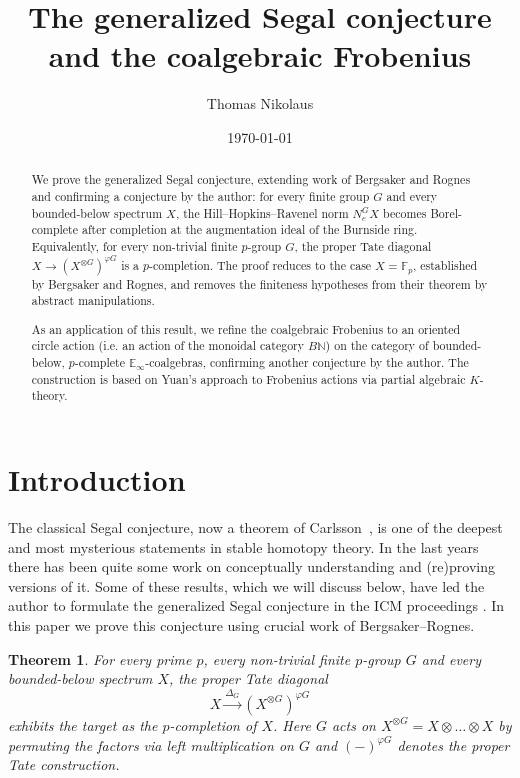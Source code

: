 \documentclass[11pt,a4paper]{article}
\title{The generalized Segal conjecture and the coalgebraic Frobenius}
\author{Thomas Nikolaus}
\date{\today}
\newtheorem{thm}{Theorem}[section]
\theoremstyle{definition}
\newcommand{\Fp}{\mathbb F_p}
\begin{document}
\maketitle

\begin{abstract}
We prove the generalized Segal conjecture, extending work of Bergsaker
and Rognes and confirming a conjecture by the author:
for every finite group $G$ and every bounded-below spectrum $X$,
the Hill--Hopkins--Ravenel norm $N_e^G X$ becomes Borel-complete
after completion at the augmentation ideal of the Burnside ring.
Equivalently, for every non-trivial finite $p$-group $G$, the proper
Tate diagonal $X\to(X^{\otimes G})^{\varphi G}$ is a $p$-completion.
The proof reduces to the case $X=\Fp$, established by Bergsaker
and Rognes, and removes the finiteness hypotheses from their
theorem by abstract manipulations. 

As an application of this result, we refine the coalgebraic
Frobenius to an oriented circle action (i.e. an action of the monoidal category $B\mathbb N$) on the category of bounded-below, $p$-complete 
$\mathbb{E}_\infty$-coalgebras, confirming another conjecture by the author.
The construction is based on Yuan's approach to Frobenius
actions via partial algebraic $K$-theory.
\end{abstract}

\tableofcontents

\section{Introduction}

The classical Segal conjecture, now a theorem of Carlsson~\cite{Car}, is one of the deepest and most mysterious statements in stable homotopy theory. In the last years there has been quite some work on conceptually understanding and (re)proving versions of it. Some of these results, which we will discuss below, have led the author to formulate the generalized Segal conjecture in the ICM proceedings \cite[Conjecture 7.10]{Nik}. In this paper we prove this conjecture using crucial work of Bergsaker--Rognes.%


\begin{thm}\label{Tate_diagonal}
For every prime $p$, every non-trivial finite $p$-group $G$ and every bounded-below spectrum $X$, the proper Tate diagonal
\[
 X\xrightarrow{\Delta_G}(X^{\otimes G})^{\varphi G}
\]
exhibits the target as the $p$-completion of $X$. Here $G$ acts on $X^{\otimes G} = X \otimes \ldots \otimes X$ by permuting the factors via left multiplication on $G$ and $(-)^{\varphi G}$ denotes the proper Tate construction.
\end{thm}
\end{document}
